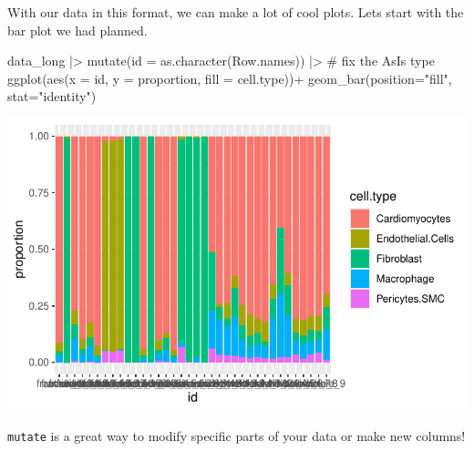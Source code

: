 \documentclass[
  letterpaper,
  DIV=11,
  numbers=noendperiod]{scrreprt}
\newenvironment{Shaded}{\begin{snugshade}}{\end{snugshade}}
\newcommand{\AttributeTok}[1]{\textcolor[rgb]{0.40,0.45,0.13}{#1}}
\newcommand{\CommentTok}[1]{\textcolor[rgb]{0.37,0.37,0.37}{#1}}
\newcommand{\FunctionTok}[1]{\textcolor[rgb]{0.28,0.35,0.67}{#1}}
\newcommand{\NormalTok}[1]{\textcolor[rgb]{0.00,0.23,0.31}{#1}}
\newcommand{\SpecialCharTok}[1]{\textcolor[rgb]{0.37,0.37,0.37}{#1}}
\newcommand{\StringTok}[1]{\textcolor[rgb]{0.13,0.47,0.30}{#1}}
\begin{document}
With our data in this format, we can make a lot of cool plots. Lets
start with the bar plot we had planned.

\begin{Shaded}
\begin{Highlighting}[]
\NormalTok{data\_long }\SpecialCharTok{|\textgreater{}} 
  \FunctionTok{mutate}\NormalTok{(}\AttributeTok{id =} \FunctionTok{as.character}\NormalTok{(Row.names)) }\SpecialCharTok{|\textgreater{}} \CommentTok{\# fix the AsIs type}
  \FunctionTok{ggplot}\NormalTok{(}\FunctionTok{aes}\NormalTok{(}\AttributeTok{x =}\NormalTok{ id, }\AttributeTok{y =}\NormalTok{ proportion, }\AttributeTok{fill =}\NormalTok{ cell.type))}\SpecialCharTok{+}
  \FunctionTok{geom\_bar}\NormalTok{(}\AttributeTok{position=}\StringTok{"fill"}\NormalTok{, }\AttributeTok{stat=}\StringTok{"identity"}\NormalTok{)}
\end{Highlighting}
\end{Shaded}

\includegraphics{scripts/03_dataWrangling/class6_files/figure-pdf/unnamed-chunk-11-1.pdf}

\begin{tcolorbox}[enhanced jigsaw, bottomtitle=1mm, bottomrule=.15mm, toprule=.15mm, opacityback=0, leftrule=.75mm, breakable, colback=white, toptitle=1mm, left=2mm, coltitle=black, titlerule=0mm, opacitybacktitle=0.6, title=\textcolor{quarto-callout-tip-color}{\faLightbulb}\hspace{0.5em}{Tip}, rightrule=.15mm, arc=.35mm, colframe=quarto-callout-tip-color-frame, colbacktitle=quarto-callout-tip-color!10!white]

\texttt{mutate} is a great way to modify specific parts of your data or
make new columns!

\end{tcolorbox}
\end{document}
